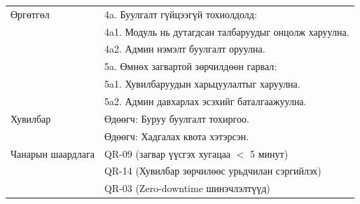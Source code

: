 \begin{longtable}{|L{4cm}|L{\dimexpr\textwidth-4cm-3\arrayrulewidth\relax}|}
Өргөтгөл & 4a. Буулгалт гүйцээгүй тохиолдолд: \\
                      & \quad 4a1. Модуль нь дутагдсан талбаруудыг онцолж харуулна. \\
                      & \quad 4a2. Админ нэмэлт буулгалт оруулна. \\[4pt]
                      & 5a. Өмнөх загвартой зөрчилдөөн гарвал: \\
                      & \quad 5a1. Хувилбаруудын харьцуулалтыг харуулна. \\
                      & \quad 5a2. Админ давхарлах эсэхийг баталгаажуулна. \\ \hline
Хувилбар & Өдөөгч: Буруу буулгалт тохиргоо.\\
                    & Өдөөгч: Хадгалах квота хэтэрсэн. \\ \hline
Чанарын шаардлага & QR-09 (загвар үүсгэх хугацаа $<$ 5 минут)\\
          & QR-14 (Хувилбар зөрчилөөс урьдчилан сэргийлэх)\\
          & QR-03 (Zero-downtime шинэчлэлтүүд) \\ \hline

\end{longtable}


\newpage
